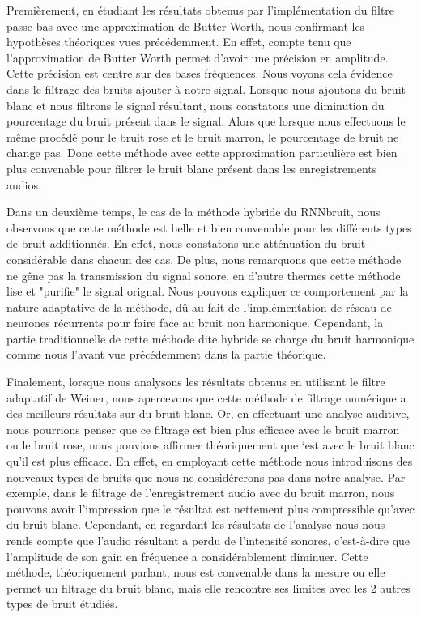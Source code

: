 \documentclass[conference,onecolumn]{IEEEtran}
\begin{document}
Premièrement, en étudiant les résultats obtenus par l'implémentation du filtre passe-bas avec une approximation de Butter Worth, nous confirmant les hypothèses théoriques vues précédemment. En effet, compte tenu que l’approximation de Butter Worth permet d’avoir une précision en amplitude. Cette précision est centre sur des bases fréquences. Nous voyons cela évidence dans le filtrage des bruits ajouter à notre signal. Lorsque nous ajoutons du bruit blanc et nous filtrons le signal résultant, nous constatons une diminution du pourcentage du bruit présent dans le signal. Alors que lorsque nous effectuons le même procédé pour le bruit rose et le bruit marron, le pourcentage de bruit ne change pas. Donc cette méthode avec cette approximation particulière est bien plus convenable pour filtrer le bruit blanc présent dans les enregistrements audios.

Dans un deuxième temps, le cas de la méthode hybride du RNNbruit, nous observons que cette méthode est belle et bien convenable pour les différents types de bruit additionnés. En effet, nous constatons une atténuation du bruit considérable dans chacun des cas. De plus, nous remarquons que cette méthode ne gêne pas la transmission du signal sonore, en d'autre thermes cette méthode lise et "purifie" le signal orignal. Nous pouvons expliquer ce comportement par la nature adaptative de la méthode, dû au fait de l'implémentation de réseau de neurones récurrents pour faire face au bruit non harmonique. Cependant, la partie traditionnelle de cette méthode dite hybride se charge du bruit harmonique comme nous l'avant vue précédemment dans la partie théorique.

Finalement, lorsque nous analysons les résultats obtenus en utilisant le filtre adaptatif de Weiner, nous apercevons que cette méthode de filtrage numérique a des meilleurs résultats sur du bruit blanc. Or, en effectuant une analyse auditive, nous pourrions penser que ce filtrage est bien plus efficace avec le bruit marron ou le bruit rose, nous pouvions affirmer théoriquement que ‘est avec le bruit blanc qu’il est plus efficace. En effet, en employant cette méthode nous introduisons des nouveaux types de bruits que nous ne considérerons pas dans notre analyse. Par exemple, dans le filtrage de l’enregistrement audio avec du bruit marron, nous pouvons avoir l’impression que le résultat est nettement plus compressible qu’avec du bruit blanc. Cependant, en regardant les résultats de l’analyse nous nous rends compte que l’audio résultant a perdu de l’intensité sonores, c’est-à-dire que l’amplitude de son gain en fréquence a considérablement diminuer. Cette méthode, théoriquement parlant, nous est convenable dans la mesure ou elle permet un filtrage du bruit blanc, mais elle rencontre ses limites avec les 2 autres types de bruit étudiés.
\end{document}
